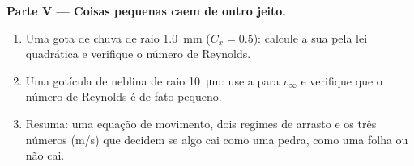 \begin{problem}
\medskip
\noindent\textbf{Parte V --- Coisas pequenas caem de outro jeito.}
\begin{enumerate}[resume]
  \item Uma gota de chuva de raio \qty{1.0}{mm} ($C_x = 0.5$): calcule a sua
         pela lei quadrática e verifique o número de
        Reynolds.
  \item Uma gotícula de neblina de raio \qty{10}{\micro m}: use a 
        para $v_\infty$ e verifique que o número de Reynolds é de fato
        pequeno.
  \item Resuma: uma equação de movimento, dois regimes de arrasto e os
        três números (\unit{m/s}) que decidem se algo cai
        como uma pedra, como uma folha ou não cai.
\end{enumerate}
\end{problem}
